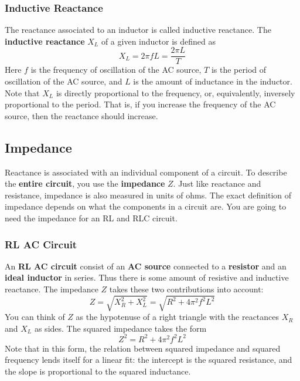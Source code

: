 \subsubsection{Inductive Reactance}
The reactance associated to an inductor is called inductive reactance. The \textbf{inductive reactance} $X_{L}$ of a given inductor is defined as
\begin{equation} \label{eq.06.reactance.L}
	X_{L} = 2 \pi f L = \frac{2 \pi L}{T}
\end{equation}
Here $f$ is the frequency of oscillation of the AC source, $T$ is the period of oscillation of the AC source, and $L$ is the amount of inductance in the inductor. Note that $X_{L}$ is directly proportional to the frequency, or, equivalently, inversely proportional to the period. That is, if you increase the frequency of the AC source, then the reactance should increase.
\subsection{Impedance}
Reactance is associated with an individual component of a circuit. To describe the \textbf{entire circuit}, you use the \textbf{impedance} $Z$. Just like reactance and resistance, impedance is also measured in units of ohms. The exact definition of impedance depends on what the components in a circuit are. You are going to need the impedance for an RL and RLC circuit.
\subsubsection{RL AC Circuit}
An \textbf{RL AC circuit} consist of an \textbf{AC source} connected to a \textbf{resistor} and an \textbf{ideal inductor} in series. Thus there is some amount of resistive and inductive reactance. The impedance $Z$ takes these two contributions into account:
\begin{equation} \label{eq.06.impedance.RL}
	Z = \sqrt{X_{R}^{2} + X_{L}^{2}} = \sqrt{R^{2} + 4 \pi^{2} f^{2} L^{2}}
\end{equation}
You can think of $Z$ as the hypotenuse of a right triangle with the reactances $X_{R}$ and $X_{L}$ as sides. The squared impedance takes the form
\begin{equation} \label{eq.06.impedance.squared}
	Z^{2} = R^{2} + 4\pi^{2} f^{2} L^{2}
\end{equation}
Note that in this form, the relation between squared impedance and squared frequency lends itself for a linear fit: the intercept is the squared resistance, and the slope is proportional to the squared inductance.

